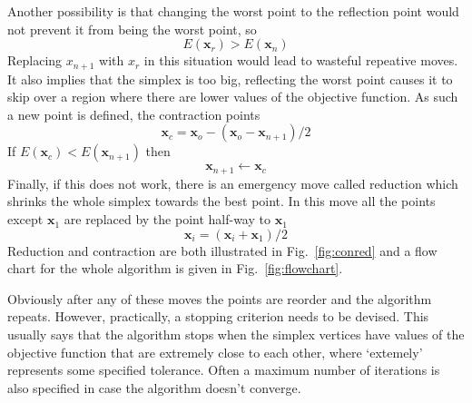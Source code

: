 \documentclass[11pt,a4paper]{scrartcl}
\begin{document}
Another possibility is that changing the worst point to the reflection
point would not prevent it from being the worst point, so
\begin{equation}
E(\mathbf{x}_r)>E(\mathbf{x}_n)
\end{equation}
Replacing $x_{n+1}$ with $x_r$ in this situation would lead to
wasteful repeative moves. It also implies that the simplex is too big,
reflecting the worst point causes it to skip over a region where there
are lower values of the objective function. As such a new point is defined, the contraction points
\begin{equation}
\mathbf{x}_c=\mathbf{x}_o-(\mathbf{x}_o-\mathbf{x}_{n+1})/2
\end{equation}
If $E(\mathbf{x}_c)<E(\mathbf{x}_{n+1})$ then
\begin{equation}
\mathbf{x}_{n+1}\leftarrow \mathbf{x}_c
\end{equation}
Finally, if this does not work, there is an emergency move called
reduction which shrinks the whole simplex towards the best point. In
this move all the points except $\mathbf{x}_1$ are replaced by the point half-way to $\mathbf{x}_1$
\begin{equation}
\mathbf{x}_i=(\mathbf{x}_i+\mathbf{x}_1)/2
\end{equation}
Reduction and contraction are both illustrated in
Fig.~\ref{fig:conred} and a flow chart for the whole algorithm is
given in Fig.~\ref{fig:flowchart}.

Obviously after any of these moves the points are reorder and the
algorithm repeats. However, practically, a stopping criterion needs to
be devised. This usually says that the algorithm stops when the
simplex vertices have values of the objective function that are
extremely close to each other, where \lq{}extemely\rq{} represents
some specified tolerance. Often a maximum number of iterations is also
specified in case the algorithm doesn't converge.
\end{document}
